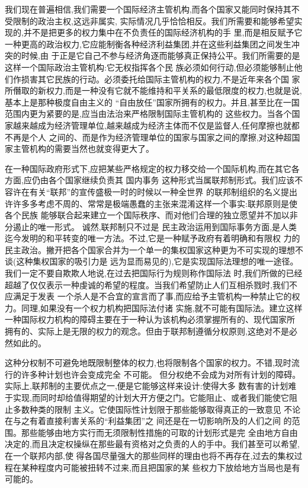 ﻿\documentclass[12pt]{article}
\begin{document}
我们现在普遍相信,我们需要一个国际经济主管机构,而各个国家又能同时保持其不受限制的政治主权,这远非属实,
实际情况几乎恰恰相反。我们所需要和能够希望实现的,并不是把更多的权力集中在不负责任的国际经济机构的手
里,而是相反赋予它一种更高的政治权力,它应能制衡各种经济利益集团,并在这些利益集团之间发生冲突的时候,由
于正是它自己不参与经济角逐而能够真正保持公平。我们所需要的是这样一个国际政治主管机构:它无权指挥各个民
族必须如何行动,但必须能够制止他们作损害其它民族的行动。必须委托给国际主管机构的权力,不是近年来各个国
家所僭取的新权力,而是一种没有它就不能维持和平关系的最低限度的权力,也就是说,基本上是那种极度自由主义的
``自由放任''国家所拥有的权力。并且,甚至比在一国范围内更为紧要的是,应当由法治来严格限制国际主管机构的
这些权力。当各个国家越来越成为经济管理单位,越来越成为经济主体而不仅是监督人,任何摩擦也就都不再是个人
之间的、而是作为经济管理单位的国家与国家之间的摩擦,对这种超国家主管机构的需要当然也就变得更大了。

在一种国际政府形式下,应把某些严格规定的权力移交给一个国际机构,而在其它各方面,应仍由各个国家继续负责其
国内事务 \myrule 这种形式当属联邦制形式。我们应该不容许在有关``联邦''的宣传盛极一时的时候以一种全世界
的联邦制组织的名义提出许许多多考虑不周的、常常是极端愚蠢的主张来混淆这样一个事实:联邦原则是使各个民族
能够联合起来建立一个国际秩序、而对他们合理的独立愿望并不加以非分遏止的唯一形式。 诚然,联邦制只不过是
民主政治运用到国际事务方面,是人类迄今发明的和平转变的唯一方法。不过,它是一种赋予政府有着明确和有限权
力的民主政治。撇开把各个国家合并为一个单一的集权国家这种更为不可实现的理想不谈(这种集权国家的吸引力是
远为显而易见的),它是实现国际法理想的唯一途径。我们一定不要自欺欺人地说,在过去把国际行为规则称作国际法
时,我们所做的已经超越了仅仅表示一种虔诚的希望的程度。当我们希望防止人们互相杀戮时,我们不应满足于发表
一个杀人是不合宜的宣言而了事,而应给予主管机构一种禁止它的权力。同理,如果没有一个权力机构把国际法付诸
实施,就不可能有国际法。建立这样一种国际权力机构的障碍主要在于一种认为该机构必须掌握所有的、现代国家所
拥有的、实际上是无限的权力的观念。但由于联邦制遵循分权原则,这绝对不是必然如此的。

这种分权制不可避免地既限制整体的权力,也将限制各个国家的权力。不错,现时流行的许多种计划也许会变成完全
不可能。 但分权绝不会成为对所有计划的障碍。实际上,联邦制的主要优点之一,便是它能够这样来设计:使得大多
数有害的计划难于实现,而同时却给值得期望的计划大开方便之门。它能阻止、或者我们能使它阻止多数种类的限制
主义。它使国际性计划限于那些能够取得真正的一致意见 \myrule 不论在与之有着直接利害关系的``利益集团''之
间还是在一切影响所及的人们之间 \myrule 的范围。那些能够由地方实行而无须限制性措施的可取的计划形式是完
全由地方自由决定的,而且决定权操纵在那些最有资格对之负责的人的手中。我们甚至可以希望,在一个联邦内部,使
得各国尽量强大的那些同样的理由也将不再存在,过去的集权过程在某种程度内可能被扭转不过来,而且把国家的某
些权力下放给地方当局也是有可能的。
\end{document}
